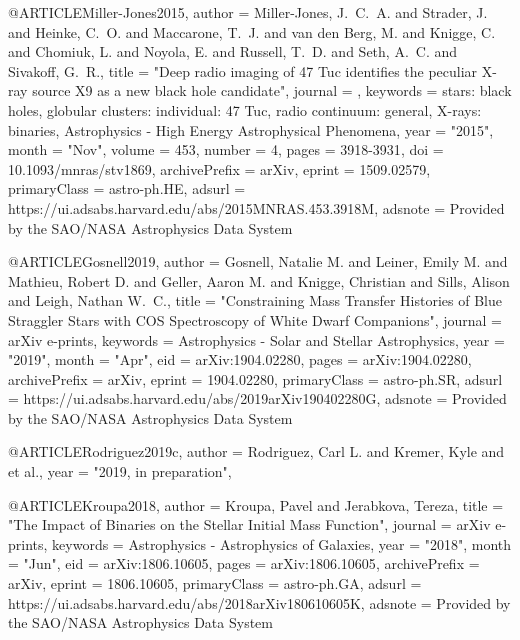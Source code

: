 \documentclass[twocolumn,tighten]{aastex63}
\begin{document}
@ARTICLE{Miller-Jones2015,
       author = {{Miller-Jones}, J.~C.~A. and {Strader}, J. and {Heinke}, C.~O. and
         {Maccarone}, T.~J. and {van den Berg}, M. and {Knigge}, C. and
         {Chomiuk}, L. and {Noyola}, E. and {Russell}, T.~D. and {Seth}, A.~C. and
         {Sivakoff}, G.~R.},
        title = "{Deep radio imaging of 47 Tuc identifies the peculiar X-ray source X9 as a new black hole candidate}",
      journal = {\mnras},
     keywords = {stars: black holes, globular clusters: individual: 47 Tuc, radio continuum: general, X-rays: binaries, Astrophysics - High Energy Astrophysical Phenomena},
         year = "2015",
        month = "Nov",
       volume = {453},
       number = {4},
        pages = {3918-3931},
          doi = {10.1093/mnras/stv1869},
archivePrefix = {arXiv},
       eprint = {1509.02579},
 primaryClass = {astro-ph.HE},
       adsurl = {https://ui.adsabs.harvard.edu/abs/2015MNRAS.453.3918M},
      adsnote = {Provided by the SAO/NASA Astrophysics Data System}
}

@ARTICLE{Gosnell2019,
       author = {{Gosnell}, Natalie M. and {Leiner}, Emily M. and {Mathieu}, Robert D. and
         {Geller}, Aaron M. and {Knigge}, Christian and {Sills}, Alison and
         {Leigh}, Nathan W.~C.},
        title = "{Constraining Mass Transfer Histories of Blue Straggler Stars with COS Spectroscopy of White Dwarf Companions}",
      journal = {arXiv e-prints},
     keywords = {Astrophysics - Solar and Stellar Astrophysics},
         year = "2019",
        month = "Apr",
          eid = {arXiv:1904.02280},
        pages = {arXiv:1904.02280},
archivePrefix = {arXiv},
       eprint = {1904.02280},
 primaryClass = {astro-ph.SR},
       adsurl = {https://ui.adsabs.harvard.edu/abs/2019arXiv190402280G},
      adsnote = {Provided by the SAO/NASA Astrophysics Data System}
}

@ARTICLE{Rodriguez2019c,
       author = {{Rodriguez}, Carl L. and {Kremer}, Kyle and {et al.}},
       year = "2019, in preparation",
}

@ARTICLE{Kroupa2018,
       author = {{Kroupa}, Pavel and {Jerabkova}, Tereza},
        title = "{The Impact of Binaries on the Stellar Initial Mass Function}",
      journal = {arXiv e-prints},
     keywords = {Astrophysics - Astrophysics of Galaxies},
         year = "2018",
        month = "Jun",
          eid = {arXiv:1806.10605},
        pages = {arXiv:1806.10605},
archivePrefix = {arXiv},
       eprint = {1806.10605},
 primaryClass = {astro-ph.GA},
       adsurl = {https://ui.adsabs.harvard.edu/abs/2018arXiv180610605K},
      adsnote = {Provided by the SAO/NASA Astrophysics Data System}
}
\end{document}
